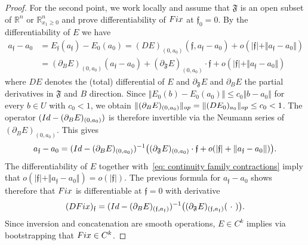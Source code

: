 \documentclass[10pt,a4paper]{amsart}
\begin{document}
\begin{proof}
For the second point, we work locally and assume that $\mathfrak{F}$ is an open subset of $\mathbb{R}^n$ or $\mathbb{R}^n_{x_1\geq 0}$ and prove differentiability of $\textup{Fix}$ at $\mathfrak{f}_0=0$. By the differentiability of $E$ we have
\begin{align*}
a_\mathfrak{f} - a_0 &= E_\mathfrak{f}(a_\mathfrak{f}) - E_0(a_0) = (DE)_{(0,a_0)}(\mathfrak{f},a_{\mathfrak{f}}-a_0) + o (\vert \mathfrak{f} \vert +\Vert a_{\mathfrak{f}}-a_0 \Vert) \\
&= (\partial_B E)_{(0,a_0)}(a_\mathfrak{f} - a_0) + (\partial_{\mathfrak{F}} E)_{(0,a_0)} \cdot \mathfrak{f} + o (\vert \mathfrak{f} \vert+\Vert a_\mathfrak{f} -a_0 \Vert)
\end{align*}
where $DE$ denotes the (total) differential of $E$ and $\partial_{\mathfrak{F}}E$ and $\partial_BE$ the partial derivatives in $\mathfrak{F}$ and $B$ direction. Since $\Vert E_0(b) - E_0(a_0) \Vert \leq c_0 \Vert b - a_0 \Vert$ for every $b \in U$ with $c_0<1$, we obtain $\Vert (\partial_BE)_{(0,a_0)} \Vert_{\textup{op}} = \Vert (DE_0)_{a_0} \Vert_{\textup{op}} \leq c_0 <1$. The operator $(\textup{Id} - (\partial_BE)_{(0,a_0)})$ is therefore invertible via the Neumann series of $(\partial_BE)_{(0,a_0)}$. This gives \[ a_\mathfrak{f} - a_0 = (\textup{Id} - (\partial_BE)_{(0,a_0)} )^{-1} \big((\partial_{\mathfrak{F}} E)_{(0,a_0)} \cdot \mathfrak{f} + o (\vert \mathfrak{f} \vert+\Vert a_\mathfrak{f} -a_0 \Vert)\big). \] The differentiability of $E$ together with~\eqref{eq: continuity family contractions} imply that $o(\vert \mathfrak{f}\vert + \Vert a_\mathfrak{f} -a_0 \Vert)=o(\vert \mathfrak{f} \vert)$. The previous formula for $a_\mathfrak{f}-a_0$ shows therefore that $\textup{Fix}$ is differentiable at $\mathfrak{f}=0$ with derivative \[ (D\textup{Fix})_\mathfrak{f} = (\textup{Id} - (\partial_BE)_{(\mathfrak{f},a_\mathfrak{f})} )^{-1} \big( (\partial_{\mathfrak{F}} E)_{(\mathfrak{f},a_\mathfrak{f})}(\ \cdot\ )\big). \] Since inversion and concatenation are smooth operations, $E \in C^k$ implies via bootstrapping that $\textup{Fix}\in C^k$.
\end{proof}
\end{document}
